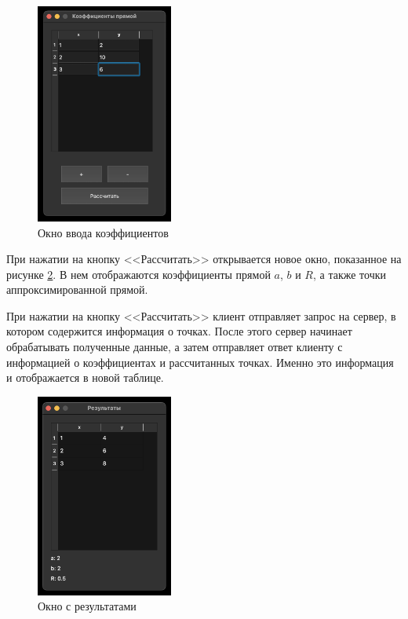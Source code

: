 \documentclass[a4paper, 14pt]{extarticle}
\begin{document}
\begin{figure}[H]
  \centering
  \includegraphics[width=0.4\textwidth]{images/task-2/1.png}
  \caption{Окно ввода коэффициентов}
  \label{fig:task-2-1}
\end{figure}

При нажатии на кнопку <<Рассчитать>> открывается новое окно, показанное на
рисунке \ref{fig:task-2-2}. В нем отображаются коэффициенты прямой \(a\), \(b\)
и \(R\), а также точки аппроксимированной прямой.

При нажатии на кнопку <<Рассчитать>> клиент отправляет запрос на сервер, в
котором содержится информация о точках. После этого сервер начинает обрабатывать
полученные данные, а затем отправляет ответ клиенту с информацией о
коэффициентах и рассчитанных точках. Именно это информация и отображается в
новой таблице.

\begin{figure}[H]
  \centering
  \includegraphics[width=0.4\textwidth]{images/task-2/2.png}
  \caption{Окно с результатами}
  \label{fig:task-2-2}
\end{figure}
\end{document}
